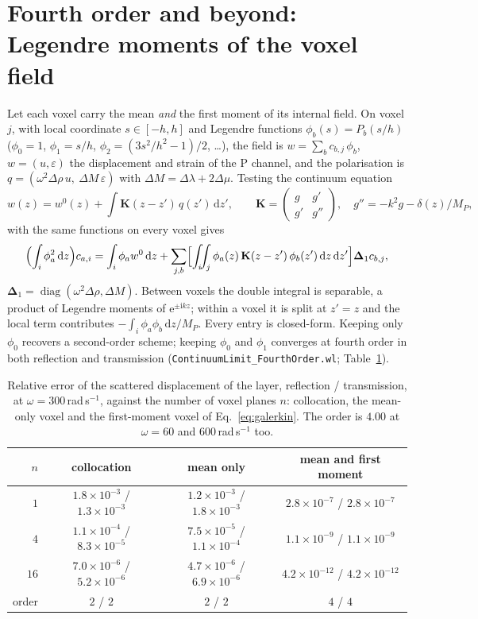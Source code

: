 \documentclass[11pt,a4paper]{article}
\newcommand{\bK}{\mathbf{K}}
\newcommand{\bD}{\boldsymbol{\Delta}}
\newcommand{\nb}[1]{\texttt{#1}}
\newcommand{\dd}{\mathrm{d}}
\begin{document}
\section{Fourth order and beyond: Legendre moments of the voxel field}\label{sec:fourth}

Let each voxel carry the mean \emph{and} the first moment of its internal field. On voxel $j$, with
local coordinate $s\in[-h,h]$ and Legendre functions $\phi_b(s)=P_b(s/h)$ ($\phi_0=1$, $\phi_1=s/h$,
$\phi_2=(3s^2/h^2-1)/2$, \dots), the field is
$w=\sum_{b}c_{b,j}\,\phi_b$, $w=(u,\varepsilon)$ the displacement and strain of the P channel, and
the polarisation is $q=(\omega^2\Delta\rho\,u,\ \Delta M\,\varepsilon)$ with $\Delta M=\Delta\lambda
+2\Delta\mu$. Testing the continuum equation
\begin{equation}
  w(z)=w^0(z)+\int\bK(z-z')\,q(z')\,\dd z',\qquad
  \bK=\begin{pmatrix} g & g' \\ g' & g''\end{pmatrix},\quad g''=-k^2g-\delta(z)/M_P,
\end{equation}
with the same functions on every voxel gives
\begin{equation}\label{eq:galerkin}
  \Bigl(\int_{i}\phi_a^2\,\dd z\Bigr)c_{a,i}
  =\int_i\phi_a w^0\,\dd z+\sum_{j,b}\Bigl[\int_i\!\!\int_j\phi_a(z)\,\bK(z-z')\,\phi_b(z')\,\dd z\,\dd z'\Bigr]
  \bD_1 c_{b,j},
\end{equation}
$\bD_1=\operatorname{diag}(\omega^2\Delta\rho,\Delta M)$. Between voxels the double integral is
separable, a product of Legendre moments of $\mathrm{e}^{\pm \mathrm{i}kz}$; within a voxel it is split at $z'=z$ and
the local term contributes $-\int_i\phi_a\phi_b\,\dd z/M_P$. Every entry is closed-form. Keeping only
$\phi_0$ recovers a second-order scheme; keeping $\phi_0$ and $\phi_1$ converges at fourth order in
both reflection and transmission (\nb{ContinuumLimit\_FourthOrder.wl}; Table~\ref{tab:fourth1d}).
\begin{table}[htbp]
\centering
\caption{Relative error of the scattered displacement of the layer, reflection / transmission, at $\omega=300$\,rad\,s$^{-1}$, against the number of voxel planes $n$: collocation, the mean-only voxel and the first-moment voxel of Eq.~\eqref{eq:galerkin}. The order is $4.00$ at $\omega=60$ and $600$\,rad\,s$^{-1}$ too.}\label{tab:fourth1d}
\begin{tabular}{@{}rccc@{}}
\toprule
$n$ & collocation & mean only & mean and first moment \\
\midrule
$1$  & $1.8\times10^{-3}$ / $1.3\times10^{-3}$ & $1.2\times10^{-3}$ / $1.8\times10^{-3}$ &
       $2.8\times10^{-7}$ / $2.8\times10^{-7}$ \\
$4$  & $1.1\times10^{-4}$ / $8.3\times10^{-5}$ & $7.5\times10^{-5}$ / $1.1\times10^{-4}$ &
       $1.1\times10^{-9}$ / $1.1\times10^{-9}$ \\
$16$ & $7.0\times10^{-6}$ / $5.2\times10^{-6}$ & $4.7\times10^{-6}$ / $6.9\times10^{-6}$ &
       $4.2\times10^{-12}$ / $4.2\times10^{-12}$ \\
order & $2$ / $2$ & $2$ / $2$ & $4$ / $4$ \\
\bottomrule
\end{tabular}
\end{table}
\end{document}
